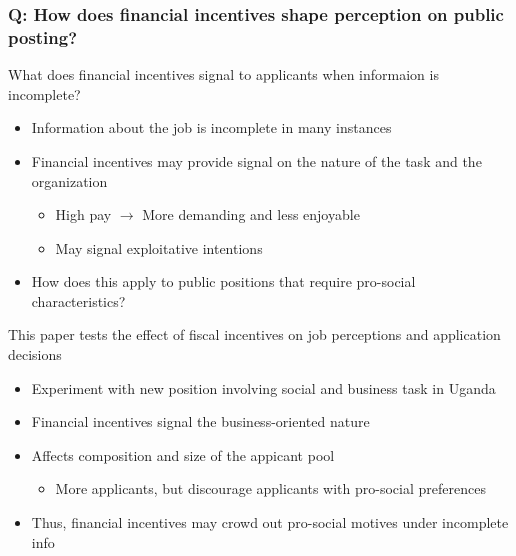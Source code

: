 \documentclass[aspectratio=169]{beamer}
\begin{document}
\begin{frame}
\frametitle{Q: How does financial incentives shape perception on public posting?} 
What does financial incentives signal to applicants when informaion is incomplete?
\begin{itemize}\setlength\itemsep{3pt}
 \item Information about the job is incomplete in many instances
\item Financial incentives may provide signal on the nature of the task and the organization
 \begin{itemize}\setlength\itemsep{3pt}
\item High pay $\to$ More demanding and less enjoyable
\item May signal exploitative intentions
\end{itemize}
\item How does this apply to public positions that require pro-social characteristics?
\end{itemize}\medskip
This paper tests the effect of fiscal incentives on job perceptions and application decisions
\begin{itemize}\setlength\itemsep{3pt}
  \item Experiment with new position involving social and business task in Uganda
  \item Financial incentives signal the business-oriented nature
  \item Affects composition and size of the appicant pool
   \begin{itemize}\setlength\itemsep{3pt}
\item More applicants, but discourage applicants with pro-social preferences
\end{itemize}
\item Thus, financial incentives may crowd out pro-social motives under incomplete info
  \end{itemize}
\end{frame}
\end{document}
